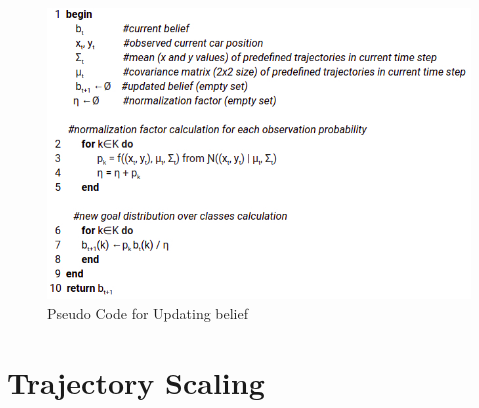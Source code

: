 \begin{figure}[h]
	\centering  	
	\includegraphics[width=13cm]{img/pseudo_belief update.jpg}
	\caption{Pseudo Code for Updating belief}
	\label{fig:PseudoBelief}    
\end{figure}

\section{Trajectory Scaling}

